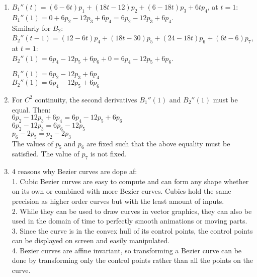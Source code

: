 \documentclass[12pt]{article}
\begin{document}
\begin{enumerate}
\begin{enumerate}
\begin{center}
\end{center}
\item %
$B_1''(t) = (6-6t)p_1 + (18t-12)p_2 + (6-18t)p_3 + 6tp_4$, at $t=1$:\\
$B_1''(1) = 0 + 6p_2 - 12p_3 + 6p_4 = 6p_2 - 12p_3 + 6p_4$.\\ Similarly for $B_2$:\\
$B_2''(t-1) = (12-6t)p_4 + (18t-30)p_5 + (24-18t)p_6 + (6t-6)p_7$, at $t=1$:\\
$B_2''(1) = 6p_4 - 12p_5 + 6p_6 + 0 = 6p_4 - 12p_5 + 6p_6$.\begin{center}
$B_1''(1) = 6p_2 - 12p_3 + 6p_4$\\
$B_2''(1) = 6p_4 - 12p_5 + 6p_6$\\
\end{center}
\item %
For $C^2$ continuity, the second derivatives $B_1''(1)$ and $B_2''(1)$ must be equal.  Then:\\
$6p_2 - 12p_3 + 6p_4 = 6p_4 - 12p_5 + 6p_6$\\
$6p_2 - 12p_3 = 6p_6 - 12p_5$\\
$p_6 - 2p_5 = p_2 - 2p_3$\\
The values of $p_5$ and $p_6$ are fixed such that the above equality must be satisfied. The value of $p_7$ is not fixed.
\item %
4 reasons why Bezier curves are dope af:\\
 1. Cubic Bezier curves are easy to compute and can form any shape whether on its own or combined with more Bezier curves. Cubics hold the same precision as higher order curves but with the least amount of inputs.\\
 2. While they can be used to draw curves in vector graphics, they can also be used in the domain of time to perfectly smooth animations or moving parts.\\
 3. Since the curve is in the convex hull of its control points, the control points can be displayed on screen and easily manipulated.\\
 4. Bezier curves are affine invariant, so transforming a Bezier curve can be done by transforming only the control points rather than all the points on the curve.
\end{enumerate}
\end{enumerate}
\end{document}
